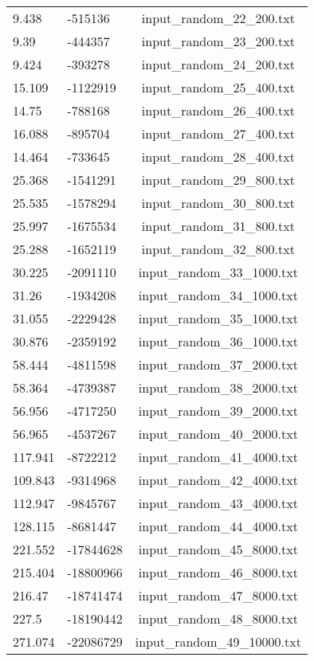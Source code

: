 \begin{longtable}[hb]{|l|l|c|}
    9.438 & -515136 & input\_random\_22\_200.txt \\
    9.39 & -444357 & input\_random\_23\_200.txt \\
    9.424 & -393278 & input\_random\_24\_200.txt \\
    15.109 & -1122919 & input\_random\_25\_400.txt \\
    14.75 & -788168 & input\_random\_26\_400.txt \\
    16.088 & -895704 & input\_random\_27\_400.txt \\
    14.464 & -733645 & input\_random\_28\_400.txt \\
    25.368 & -1541291 & input\_random\_29\_800.txt \\
    25.535 & -1578294 & input\_random\_30\_800.txt \\
    25.997 & -1675534 & input\_random\_31\_800.txt \\
    25.288 & -1652119 & input\_random\_32\_800.txt \\
    30.225 & -2091110 & input\_random\_33\_1000.txt \\
    31.26 & -1934208 & input\_random\_34\_1000.txt \\
    31.055 & -2229428 & input\_random\_35\_1000.txt \\
    30.876 & -2359192 & input\_random\_36\_1000.txt \\
    58.444 & -4811598 & input\_random\_37\_2000.txt \\
    58.364 & -4739387 & input\_random\_38\_2000.txt \\
    56.956 & -4717250 & input\_random\_39\_2000.txt \\
    56.965 & -4537267 & input\_random\_40\_2000.txt \\
    117.941 & -8722212 & input\_random\_41\_4000.txt \\
    109.843 & -9314968 & input\_random\_42\_4000.txt \\
    112.947 & -9845767 & input\_random\_43\_4000.txt \\
    128.115 & -8681447 & input\_random\_44\_4000.txt \\
    221.552 & -17844628 & input\_random\_45\_8000.txt \\
    215.404 & -18800966 & input\_random\_46\_8000.txt \\
    216.47 & -18741474 & input\_random\_47\_8000.txt \\
    227.5 & -18190442 & input\_random\_48\_8000.txt \\
    271.074 & -22086729 & input\_random\_49\_10000.txt \\

\end{longtable}
